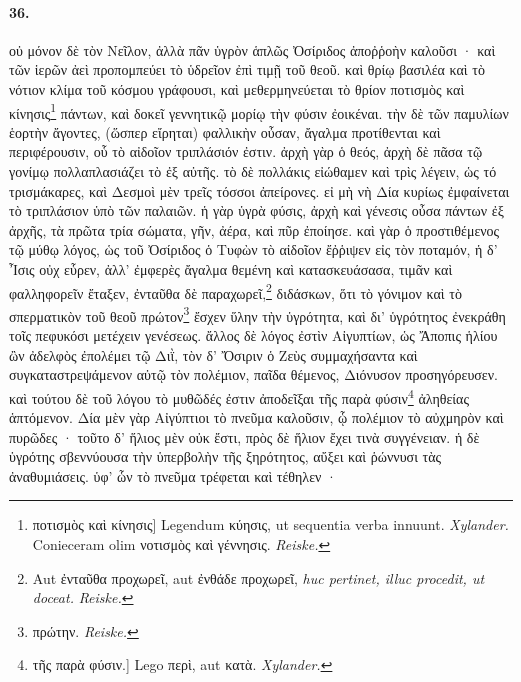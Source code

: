 \documentclass[a4paper, 11pt, oneside, polutonikogreek, german, landscape]{article}
\begin{document}
\paragraph{36.}
οὐ μόνον δὲ τὸν Νεῖλον, ἀλλὰ πᾶν ὑγρὸν ἁπλῶς Ὀσίριδος ἀποῤῥοὴν καλοῦσι · καὶ τῶν ἱερῶν ἀεὶ προπομπεύει τὸ ὑδρεῖον ἐπὶ τιμῇ τοῦ θεοῦ. καὶ θρίῳ βασιλέα καὶ τὸ νότιον κλίμα τοῦ κόσμου γράφουσι, καὶ μεθερμηνεύεται τὸ θρίον ποτισμὸς καὶ κίνησις\footnote{ποτισμὸς καὶ κίνησις] Legendum κύησις, ut sequentia verba innuunt. \emph{Xylander.} Conieceram olim νοτισμὸς καὶ γέννησις. \emph{Reiske.}} πάντων, καὶ δοκεῖ γεννητικῷ μορίῳ τὴν φύσιν ἐοικέναι. τὴν δὲ τῶν παμυλίων ἑορτὴν ἄγοντες, (ὥσπερ εἴρηται) φαλλικὴν οὖσαν, ἄγαλμα προτίθενται καὶ περιφέρουσιν, οὗ τὸ αἰδοῖον τριπλάσιόν ἐστιν. ἀρχὴ γὰρ ὁ θεός, ἀρχὴ δὲ πᾶσα τῷ γονίμῳ πολλαπλασιάζει τὸ ἐξ αὐτῆς. τὸ δὲ πολλάκις εἰώθαμεν καὶ τρὶς λέγειν, ὡς τό τρισμάκαρες, καὶ Δεσμοὶ μὲν τρεῖς τόσσοι ἀπείρονες. εἰ μὴ νὴ Δία κυρίως ἐμφαίνεται τὸ τριπλάσιον ὑπὸ τῶν παλαιῶν. ἡ γὰρ ὑγρὰ φύσις, ἀρχὴ καὶ γένεσις οὖσα πάντων ἐξ ἀρχῆς, τὰ πρῶτα τρία σώματα, γῆν, ἀέρα, καὶ πῦρ ἐποίησε. καὶ γὰρ ὁ προστιθέμενος τῷ μύθῳ λόγος, ὡς τοῦ Ὀσίριδος ὁ Τυφὼν τὸ αἰδοῖον ἔῤῥιψεν εἰς τὸν ποταμόν, ἡ δ' Ἶσις οὐχ εὗρεν, ἀλλ' ἐμφερὲς ἄγαλμα θεμένη καὶ κατασκευάσασα, τιμᾶν καὶ φαλληφορεῖν ἔταξεν, ἐνταῦθα δὲ παραχωρεῖ,\footnote{Aut ἐνταῦθα προχωρεῖ, aut ἐνθάδε προχωρεῖ, \emph{huc pertinet, illuc procedit, ut doceat.} \emph{Reiske.}} διδάσκων, ὅτι τὸ γόνιμον καὶ τὸ σπερματικὸν τοῦ θεοῦ πρώτον\footnote{πρώτην. \emph{Reiske.}} ἔσχεν ὕλην τὴν ὑγρότητα, καὶ δι' ὑγρότητος ἐνεκράθη τοῖς πεφυκόσι μετέχειν γενέσεως. ἄλλος δὲ λόγος ἐστὶν Αἰγυπτίων, ὡς Ἄποπις ἡλίου ὢν ἀδελφὸς ἐπολέμει τῷ Διῒ, τὸν δ' Ὄσιριν ὁ Ζεὺς συμμαχήσαντα καὶ συγκαταστρεψάμενον αὐτῷ τὸν πολέμιον, παῖδα θέμενος, Διόνυσον προσηγόρευσεν. καὶ τούτου δὲ τοῦ λόγου τὸ μυθῶδές ἐστιν ἀποδεῖξαι τῆς παρὰ φύσιν\footnote{τῆς παρὰ φύσιν.] Lego περὶ, aut κατὰ. \emph{Xylander.}} ἀληθείας ἁπτόμενον. Δία μὲν γὰρ Αἰγύπτιοι τὸ πνεῦμα καλοῦσιν, ᾧ πολέμιον τὸ αὐχμηρὸν καὶ πυρῶδες · τοῦτο δ' ἥλιος μὲν οὐκ ἔστι, πρὸς δὲ ἥλιον ἔχει τινὰ συγγένειαν. ἡ δὲ ὑγρότης σβεννύουσα τὴν ὑπερβολὴν τῆς ξηρότητος, αὔξει καὶ ῥώννυσι τὰς ἀναθυμιάσεις. ὑφ' ὧν τὸ πνεῦμα τρέφεται καὶ τέθηλεν ·
\end{document}
